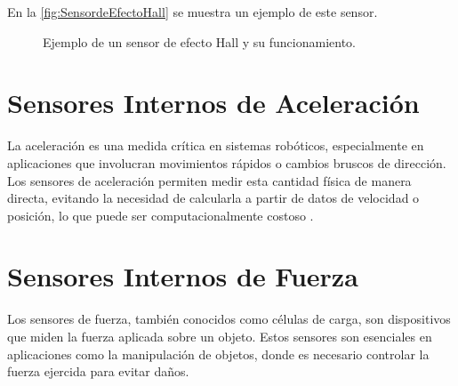 En la \autoref{fig:SensordeEfectoHall} se muestra un ejemplo de este sensor.

\begin{figure}[h!]
	\centering
	\caption{Ejemplo de un sensor de efecto Hall y su funcionamiento.}
	\label{fig:SensordeEfectoHall}
\end{figure}

\section{Sensores Internos de Aceleración}

La aceleración es una medida crítica en sistemas robóticos, especialmente en aplicaciones que involucran movimientos rápidos o cambios bruscos de dirección. Los sensores de aceleración permiten medir esta cantidad física de manera directa, evitando la necesidad de calcularla a partir de datos de velocidad o posición, lo que puede ser computacionalmente costoso \cite{Acelerometro}.

\section{Sensores Internos de Fuerza}

Los sensores de fuerza, también conocidos como células de carga, son dispositivos que miden la fuerza aplicada sobre un objeto. Estos sensores son esenciales en aplicaciones como la manipulación de objetos, donde es necesario controlar la fuerza ejercida para evitar daños.

